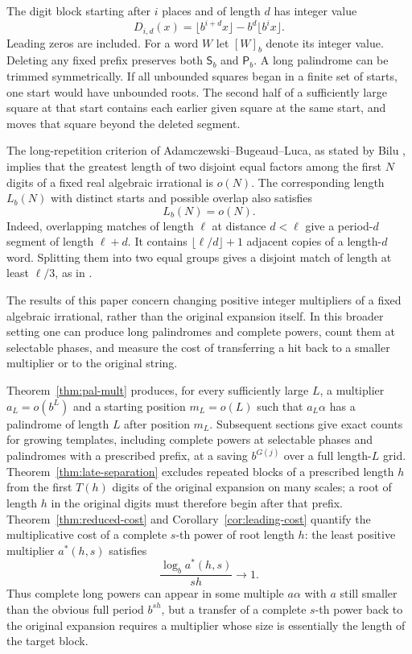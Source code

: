 \documentclass[11pt,reqno,a4paper]{amsart}
\theoremstyle{remark}
\begin{document}
The digit block starting after $i$ places and of length $d$ has integer value
\begin{equation}\label{eq:digitblock}
 D_{i,d}(x)=\lfloor b^{i+d}x\rfloor-b^d\lfloor b^i x\rfloor.
\end{equation}
Leading zeros are included. For a word $W$ let $[W]_b$ denote its integer value. Deleting any fixed prefix preserves both $\mathsf S_b$ and $\mathsf P_b$. A long palindrome can be trimmed symmetrically. If all unbounded squares began in a finite set of starts, one start would have unbounded roots. The second half of a sufficiently large square at that start contains each earlier given square at the same start, and moves that square beyond the deleted segment.

The long-repetition criterion of Adamczewski--Bugeaud--Luca, as stated by Bilu \cite[Theorem~3.3, p.~8]{Bilu}, implies that the greatest length of two disjoint equal factors among the first $N$ digits of a fixed real algebraic irrational is $o(N)$. The corresponding length $L_b(N)$ with distinct starts and possible overlap also satisfies
\begin{equation}\label{eq:known-early}
 L_b(N)=o(N).
\end{equation}
Indeed, overlapping matches of length $\ell$ at distance $d<\ell$ give a period-$d$ segment of length $\ell+d$. It contains $\lfloor\ell/d\rfloor+1$ adjacent copies of a length-$d$ word. Splitting them into two equal groups gives a disjoint match of length at least $\ell/3$, as in \cite[Lemma~3.4]{Bilu}.

The results of this paper concern changing positive integer multipliers of a fixed algebraic irrational, rather than the original expansion itself. In this broader setting one can produce long palindromes and complete powers, count them at selectable phases, and measure the cost of transferring a hit back to a smaller multiplier or to the original string.

Theorem~\ref{thm:pal-mult} produces, for every sufficiently large $L$, a multiplier $a_L=o(b^L)$ and a starting position $m_L=o(L)$ such that $a_L\alpha$ has a palindrome of length $L$ after position $m_L$. Subsequent sections give exact counts for growing templates, including complete powers at selectable phases and palindromes with a prescribed prefix, at a saving $b^{G(j)}$ over a full length-$L$ grid. Theorem~\ref{thm:late-separation} excludes repeated blocks of a prescribed length $h$ from the first $T(h)$ digits of the original expansion on many scales; a root of length $h$ in the original digits must therefore begin after that prefix. Theorem~\ref{thm:reduced-cost} and Corollary~\ref{cor:leading-cost} quantify the multiplicative cost of a complete $s$-th power of root length $h$: the least positive multiplier $a^*(h,s)$ satisfies
\[
 \frac{\log_b a^*(h,s)}{sh}\longrightarrow 1.
\]
Thus complete long powers can appear in some multiple $a\alpha$ with $a$ still smaller than the obvious full period $b^{sh}$, but a transfer of a complete $s$-th power back to the original expansion requires a multiplier whose size is essentially the length of the target block.
\end{document}

